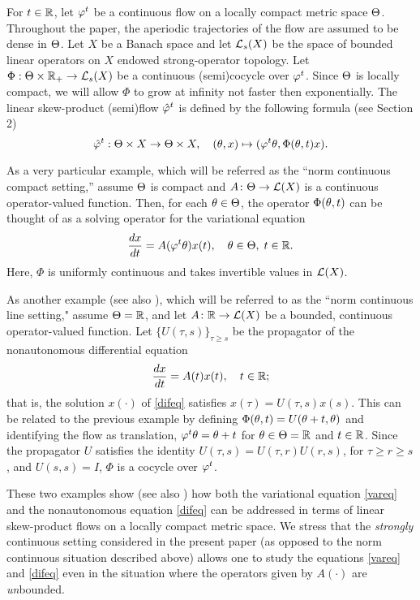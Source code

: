 For $t\in{\Bbb{R}}$, let $\varphi^t$ be a continuous flow on
a locally compact metric space  $\Theta$.
Throughout the paper, the aperiodic trajectories of
the flow are assumed to be
dense in $\Theta$.  Let $X$ be a Banach space and let
${\cal{L}}_s(X)$ be the space of bounded linear operators on
$X$  endowed strong-operator topology.
Let $\Phi : \Theta\times{\Bbb{R}}_+\to {\cal{L}}_s(X)$ be a  continuous
(semi)cocycle  over $\varphi^t$.  Since $\Theta$ is locally compact, we
will allow $\Phi$ to grow at infinity not faster then exponentially. The
linear skew-product (semi)flow ${\hat{\varphi}}^t$ is defined by the
following formula (see Section 2)
 \[ {\hat{\varphi}}^t :\Theta\times X\to \Theta\times X,
\quad  (\theta,x)\mapsto (\varphi^t\theta,\Phi(\theta,t)x).\]

\begin{exmp} As a very particular example, which
will be referred as the ``norm continuous compact
setting,'' assume $\Theta$ is compact
and $A\colon \Theta\to {\cal{L}}(X)$ is a continuous
operator-valued function. Then, for each $\theta\in\Theta$, the operator
 $\Phi(\theta,t)$
can be thought of as a solving operator for the variational equation
\begin{equation}\label{vareq}
\dfrac{dx}{dt}=A(\varphi^t\theta)x(t),
\quad \theta\in \Theta,\; t\in{\Bbb{R}}.
\end{equation}
Here, $\Phi$ is uniformly continuous and takes
invertible values in ${\cal{L}}(X)$.
\end{exmp}

\begin{exmp}
As another example  (see also \cite{ChLe3}), which will be referred to
as the ``norm continuous line setting," assume $\Theta={\Bbb{R}}$,  and let
$A\colon {\Bbb{R}}\to {\cal{L}}(X)$ be a
bounded, continuous operator-valued function.
Let $\{U(\tau,s)\}_{\tau\ge s}$ be the propagator of the
nonautonomous differential equation
\begin{equation}\label{difeq}
\dfrac{dx}{dt}=A(t)x(t),
\quad t\in{\Bbb{R}};
\end{equation}
that is, the solution $x(\cdot)$ of \eqref{difeq} satisfies
$x(\tau)=U(\tau,s)x(s)$.  This can be related to the previous example
by defining $\Phi(\theta ,t)=U(\theta +t,\theta)$ and identifying the flow as
translation, $\varphi^t\theta=\theta+t$ for $\theta\in \Theta={\Bbb{R}}$ and $t\in{\Bbb{R}}$.
Since the propagator $U$ satisfies \cite{DK} the
identity $U(\tau,s)= U(\tau,r)U(r,s)$, for  $\tau\geq r\geq s$,
and $U(s,s)=I$, $\Phi$ is a cocycle over $\varphi^t$.
\end{exmp}

These two examples show
(see also \cite{ChLe3}) how both the
variational equation \eqref{vareq} and the nonautonomous
equation \eqref{difeq} can be addressed in terms of
linear skew-product flows on a locally compact
metric space.  We stress that the
{\it strongly} continuous setting considered in the present paper
(as opposed to the norm continuous situation described
above) allows one to study the equations
 \eqref{vareq} and \eqref{difeq}  even in the situation where the operators
given by $A(\cdot)$ are {\em un}bounded.

